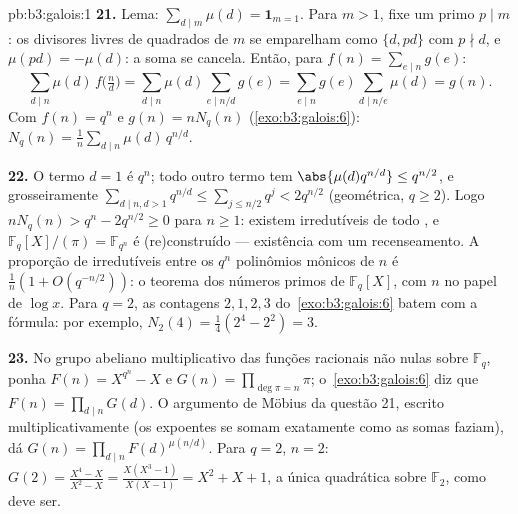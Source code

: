 \begin{solution}{pb:b3:galois:1}
\textbf{21.} Lema: $\sum_{d \mid m}\mu(d) = \mathbf
1_{m=1}$. Para $m > 1$, fixe um primo $p \mid m$: os divisores livres de quadrados
de $m$ se emparelham como $\{d, pd\}$ com $p \nmid d$,
e $\mu(pd) = -\mu(d)$: a soma se cancela. Então, para $f(n) =
\sum_{e\mid n}g(e)$:
\[
\sum_{d \mid n}\mu(d)\,f\bigl(\tfrac nd\bigr)
= \sum_{d \mid n}\mu(d)\!\!\sum_{e \mid n/d}\!\!g(e)
= \sum_{e \mid n}g(e)\!\!\sum_{d \mid n/e}\!\!\mu(d)
= g(n) .
\]
Com $f(n) = q^n$ e $g(n) = nN_q(n)$
(\cref{exo:b3:galois:6}): $N_q(n) =
\frac1n\sum_{d\mid n}\mu(d)\,q^{n/d}$.

\textbf{22.} O termo $d = 1$ é $q^n$; todo outro termo tem
$\abs{\mu(d)q^{n/d}} \leq q^{n/2}$, e grosseiramente
$\sum_{d \mid n, d > 1}q^{n/d} \leq \sum_{j \leq
n/2}q^j < 2q^{n/2}$ (geométrica, $q \geq 2$). Logo $nN_q(n) >
q^n - 2q^{n/2} \geq 0$ para $n \geq 1$: existem irredutíveis de todo
, e $\mathbb F_q[X]/(\pi) = \mathbb F_{q^n}$ é
(re)construído --- existência com um recenseamento. A proporção de
irredutíveis entre os $q^n$ polinômios mônicos de  $n$ é
$\frac1n(1 + O(q^{-n/2}))$: o teorema dos números primos de
$\mathbb F_q[X]$, com $n$ no papel de $\log x$. Para $q = 2$, as
contagens $2, 1, 2, 3$ do~\cref{exo:b3:galois:6} batem com a
fórmula: por exemplo, $N_2(4) = \frac14(2^4 - 2^2) = 3$.

\textbf{23.} No grupo abeliano multiplicativo das funções racionais
não nulas sobre $\mathbb F_q$, ponha $F(n) = X^{q^n} -
X$ e $G(n) = \prod_{\deg\pi = n}\pi$;
o~\cref{exo:b3:galois:6} diz que $F(n) = \prod_{d\mid n}G(d)$.
O argumento de Möbius da questão 21, escrito
multiplicativamente (os expoentes se somam exatamente como as somas
faziam), dá $G(n) = \prod_{d \mid n}F(d)^{\mu(n/d)}$. Para $q = 2$,
$n = 2$: $G(2) = \frac{X^4 - X}{X^2 - X} = \frac{X(X^3 -
1)}{X(X - 1)} = X^2 + X + 1$, a única quadrática 
sobre $\mathbb F_2$, como deve ser.


\end{solution}
